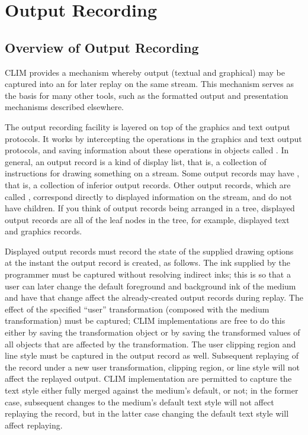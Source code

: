 
\chapter {Output Recording}
\label {output-recording}

\section {Overview of Output Recording}

CLIM provides a mechanism whereby output (textual and graphical) may be captured
into an  for later replay on the same stream.  This
mechanism serves as the basis for many other tools, such as the formatted output
and presentation mechanisms described elsewhere.

The output recording facility is layered on top of the graphics and text output
protocols.  It works by intercepting the operations in the graphics and text
output protocols, and saving information about these operations in objects
called .  In general, an output record is a kind of
display list, that is, a collection of instructions for drawing something on a
stream.  Some output records may have , that is, a collection
of inferior output records.  Other output records, which are called
, correspond directly to displayed information
on the stream, and do not have children.  If you think of output records being
arranged in a tree, displayed output records are all of the leaf nodes in the
tree, for example, displayed text and graphics records.

Displayed output records must record the state of the supplied drawing options
at the instant the output record is created, as follows.  The ink supplied by
the programmer must be captured without resolving indirect inks; this is so that
a user can later change the default foreground and background ink of the medium
and have that change affect the already-created output records during replay.
The effect of the specified ``user'' transformation (composed with the medium
transformation) must be captured; CLIM implementations are free to do this
either by saving the transformation object or by saving the transformed values
of all objects that are affected by the transformation.  The user clipping
region and line style must be captured in the output record as well.  Subsequent
replaying of the record under a new user transformation, clipping region, or
line style will not affect the replayed output.  CLIM implementation are
permitted to capture the text style either fully merged against the medium's
default, or not; in the former case, subsequent changes to the medium's default
text style will not affect replaying the record, but in the latter case changing
the default text style will affect replaying.

